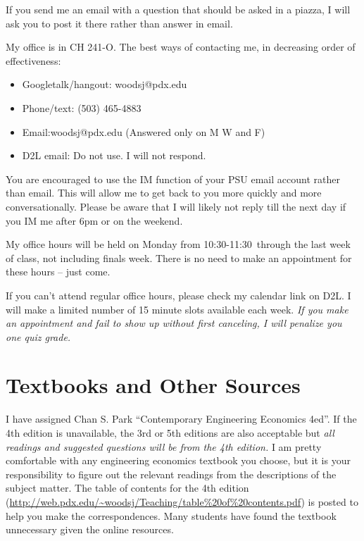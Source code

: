 \documentclass[letterpaper,10pt]{article}
\newcommand{\Office}{on Monday from 10:30-11:30}
\begin{document}
If you send me an email with a question that should be asked in a piazza, I
will ask you to post it there rather than answer in email.


 
My office is in CH 241-O.  The best ways of contacting me, in
decreasing order of effectiveness:
\begin{itemize}
\item Googletalk/hangout: woodsj@pdx.edu
\item Phone/text: (503) 465-4883
\item Email:woodsj@pdx.edu (Answered only on M W and F)
\item D2L email: Do not use.  I will not respond.
\end{itemize}

You are encouraged to use the IM function of your PSU email account rather than email. This will allow me to get back to you more quickly and more conversationally. Please be aware that I will likely not reply till the next day if you IM me after 6pm or on the weekend.  

My office hours will be held \Office ~through the last week of class, not including finals week. There is no need to make an appointment for these hours -- just come.

If you can't attend regular office hours, please check my calendar link on D2L. I will make a limited number of 15 minute slots available each week. \emph{If you make an appointment and fail to show up without first canceling, I will penalize you one quiz grade.}  



\section{Textbooks and Other Sources}
I have assigned Chan S. Park ``Contemporary Engineering Economics
4ed''.  If the 4th edition is unavailable, the 3rd or 5th editions are also
acceptable but \emph{all readings and suggested questions will be from
  the 4th edition.} I am pretty comfortable with any engineering
economics textbook you choose, but it is your responsibility to figure
out the relevant readings from the descriptions of the subject matter.
The table of contents for the 4th edition (\url{http://web.pdx.edu/~woodsj/Teaching/table\%20of\%20contents.pdf}) is posted to help you
make the correspondences.  Many students have found the textbook unnecessary given the online resources.
\end{document}
